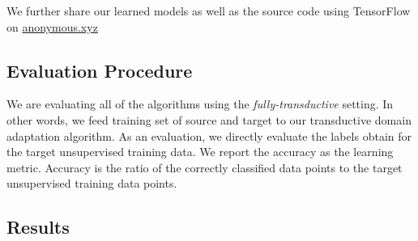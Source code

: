 We further share our learned models as well as the source code using TensorFlow\cite{tensorflow} on \url{anonymous.xyz}

\subsection{Evaluation Procedure}
We are evaluating all of the algorithms using the \emph{fully-transductive} setting. In other words,  we feed training set of source and target to our transductive domain adaptation algorithm. As an evaluation, we directly evaluate the labels obtain for the target unsupervised training data. We report the accuracy as the learning metric. Accuracy is the ratio of the correctly classified data points to the target unsupervised training data points.

\subsection{Results}
\begin{table}[t]
\caption{Accuracy of our method and the state-of-the-art algorithms on various datasets and various adaptation settings}
\label{tab:res}
\end{table}

